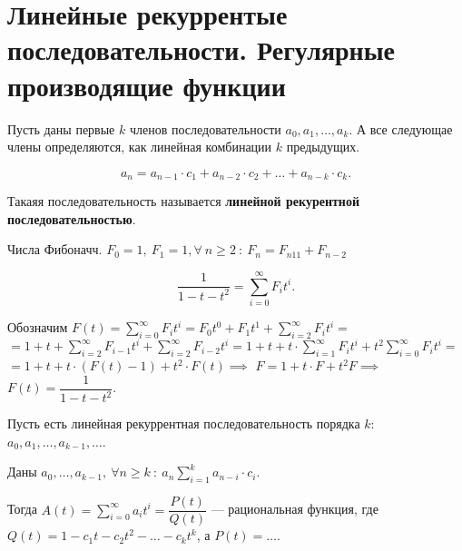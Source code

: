
\section{Линейные рекуррентые последовательности. Регулярные производящие функции}


\begin{definition}

    Пусть даны первые $k$ членов последовательности $a_0, a_1, \dots, a_k$.
    А все следующае члены определяются, как линейная комбинации $k$ предыдущих.

    \[a_n = a_{n-1} \cdot c_1 + a_{n-2} \cdot c_2 + \dots + a_{n-k} \cdot c_k. \]

    Такаяя последовательность называется \textbf{линейной рекурентной последовательностью}.
\end{definition}

\begin{example}
    Числа Фибоначч. $F_0 = 1, ~ F_1= 1, \forall ~ n \geqslant 2 ~:~ F_n = F_{n 1 1} + F_{n - 2}$

    \[
        \dfrac{1}{1 - t - t^2} = \sum_{i=0}^{\infty} F_i t^i.
    \]
\end{example}

Обозначим $F(t) = \sum\limits_{i=0}^\infty F_i t^i = F_0 t^0 + F_1 t^1 + \sum_{i=2}^\infty F_i t^i = $\\
$ = 1 + t + \sum_{i=2}^\infty F_{i-1} t^i + \sum_{i=2}^\infty F_{i-2} t^i = 1 + t + t \cdot \sum_{i=1}^\infty F_i t^i + t^2 \sum_{i = 0}^\infty F_i t^i = $\\
$ = 1 + t + t \cdot ( F(t) - 1 ) + t^2 \cdot F(t) \implies$
$F = 1 + t \cdot F + t^2 F \implies$\\
$F(t) = \dfrac{1}{1 - t  - t^2}$.

\begin{theorem}
    Пусть есть линейная рекуррентная последовательность порядка $k$:\\
     $a_0, a_1, \dots, a_{k-1}, \dots$.
    
    Даны $a_0, \dots, a_{k-1}, ~ \forall n \geqslant k~:~ a_n \sum_{i = 1}^k a_{n-i} \cdot c_i$.

    Тогда $A(t) = \sum_{i=0}^\infty a_i t^i = \dfrac{P(t)}{Q(t)}$ --- рациональная функция, где \\
    $Q(t) = 1 - c_1 t - c_2 t^2 - \dots - c_{k} t^k$, а $P(t) = \dots$.
\end{theorem}

